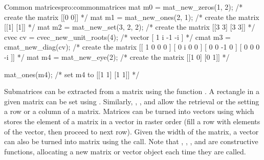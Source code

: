 \begin{program}{Common matrices}{pro:commonmatrices}
mat m0 = mat_new_zeros(1, 2);     /* create the matrix [[0 0]]       */
mat m1 = mat_new_ones(2, 1);      /* create the matrix [[1] [1]]     */
mat m2 = mat_new_set(3, 2, 2);    /* create the matrix [[3 3] [3 3]] */
cvec cv = cvec_new_unit_roots(4); /* vector [ 1 i -1 -i ]            */
cmat m3 = cmat_new_diag(cv);      /* create the matrix [[ 1  0  0  0 ]
                                                        [ 0  i  0  0 ]
                                                        [ 0  0 -1  0 ]
                                                        [ 0  0  0 -i ]] */
mat m4 = mat_new_eye(2);          /* create the matrix [[1 0] [0 1]] */

mat_ones(m4);                     /* set m4 to [[1 1] [1 1]]         */
\end{program}

Submatrices can be extracted from a matrix using the function 
    . A rectangle in a given 
    matrix can be set using . Similarly,
    , 
    , 
     and 
     allow the retrieval or
    the setting a row or a column of a matrix. Matrices can be turned into
    vectors using  which
    stores the element of a matrix in a vector in raster order (fill a
    row with elements of the vector, then proceed to next row). Given
    the width of the matrix, a vector can also be turned into matrix
    using the  call. Note that
    ,
    , 
    , 
     and 
     are constructive
    functions, allocating a new matrix or vector object each time they
    are called. 

